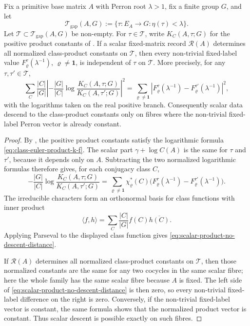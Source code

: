 \begin{theorem}
  \label{thm:scalar-class-product-no-descent}
  Fix a primitive base matrix \(A\) with Perron root \(\lambda>1\), fix a finite
  group \(G\), and let
  \[
    \mathcal T_{\mathrm{gap}}(A,G)
    :=\{\tau:E_A\to G:\eta(\tau)<\lambda\}.
  \]
  Let \(\mathscr T\subset\mathcal T_{\mathrm{gap}}(A,G)\) be non-empty.  For
  \(\tau\in\mathscr T\), write \(K_C(A,\tau;G)\) for the positive product
  constants of .  If a scalar
  fixed-matrix record \(\mathcal R(A)\) determines all normalized class-product
  constants on \(\mathscr T\), then every non-trivial fixed-label value
  \(F_\varrho^\tau(\lambda^{-1})\), \(\varrho\ne\mathbf1\), is independent of
  \(\tau\) on \(\mathscr T\).  More precisely, for any
  \(\tau,\tau'\in\mathscr T\),
  \begin{equation}\label{eq:scalar-product-no-descent-distance}
    \sum_C\frac{|C|}{|G|}
      \left|
        -\frac{|G|}{|C|}
        \log\frac{K_C(A,\tau;G)}{K_C(A,\tau';G)}
      \right|^2
    =
    \sum_{\varrho\ne\mathbf1}
      \left|
        F_\varrho^\tau(\lambda^{-1})
        -F_\varrho^{\tau'}(\lambda^{-1})
      \right|^2,
  \end{equation}
  with the logarithms taken on the real positive branch.  Consequently scalar
  data descend to the class-product constants only on fibres where the
  non-trivial fixed-label Perron vector is already constant.
\end{theorem}

\begin{proof}
  By , the positive product constants
  satisfy the logarithmic formula \eqref{eq:class-euler-product-k-f}.  The
  scalar part \(\gamma+\log C(A)\) is the same for \(\tau\) and \(\tau'\),
  because it depends only on \(A\).  Subtracting the two normalized logarithmic
  formulas therefore gives, for each conjugacy class \(C\),
  \[
    -\frac{|G|}{|C|}
    \log\frac{K_C(A,\tau;G)}{K_C(A,\tau';G)}
    =
      \sum_{\varrho\ne\mathbf1}
        \chi_\varrho^\ast(C)
        \bigl(
          F_\varrho^\tau(\lambda^{-1})
          -F_\varrho^{\tau'}(\lambda^{-1})
        \bigr).
  \]
  The irreducible characters form an orthonormal basis for class functions with
  inner product
  \[
    \langle f,h\rangle=\sum_C\frac{|C|}{|G|}f(C)\overline{h(C)}.
  \]
  Applying Parseval to the displayed class function gives
  \eqref{eq:scalar-product-no-descent-distance}.

  If \(\mathcal R(A)\) determines all normalized class-product constants on
  \(\mathscr T\), then those normalized constants are the same for any two
  cocycles in the same scalar fibre; here the whole family has the same scalar
  fibre because \(A\) is fixed.  The left side of
  \eqref{eq:scalar-product-no-descent-distance} is then zero, so every
  non-trivial fixed-label difference on the right is zero.  Conversely, if the
  non-trivial fixed-label vector is constant, the same formula shows that the
  normalized product vector is constant.  Thus scalar descent is possible
  exactly on such fibres.
\end{proof}

